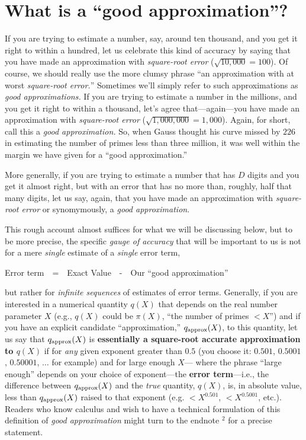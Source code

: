 \documentclass[11pt,draft]{article}
\theoremstyle{plain}
\theoremstyle{definition}
\numberwithin{equation}{section}
\numberwithin{figure}{section}
\numberwithin{table}{section}
\begin{document}
\section{What is a ``good approximation''?}\label{sec:sqrterror}

If you are trying to estimate a number, say, around ten thousand, and
you get it right to within a hundred, let us celebrate this kind of
accuracy by saying that you have made an approximation with {\em
  square-root error} (${\sqrt{10,\!000}}=100$). Of course, we should
really use the more clumsy phrase ``an approximation with at worst
{\em square-root error.}''  Sometimes we'll simply refer to such
approximations as {\em good approximations.} If you are trying to
estimate a number in the millions, and you get it right to within a
thousand, let's agree that---again---you have made an approximation
with {\em square-root error} (${\sqrt{1,\!000,\!000}}=1,\!000$).
Again, for short, call this a {\em good approximation.} So, when Gauss
thought his curve missed by $226$ in estimating the number of primes
less than three million, it was well within the margin we have given
for a ``good approximation.''

More generally, if you are trying to estimate a number that has $D$
digits and you get it almost right, but with an error that has no more
than, roughly, half that many digits, let us say, again, that you have
made an approximation with {\em square-root error} or synomymously, a
{\em good approximation}.


This rough account almost suffices for what we will be discussing
below, but to be more precise, the specific {\em gauge of accuracy}
that will be important to us is not for a mere {\em single} estimate
of a {\em single} error term, \bigskip
 
 \centerline{Error term\ \  =\ \    Exact Value\ \   -\ \   Our ``good  approximation''}
  
 \bigskip
 
 \noindent but rather for {\em infinite sequences} of estimates of
 error terms. Generally, if you are interested in a numerical quantity
 $q(X)$ that depends on the real number parameter $X$ (e.g., $q(X)$
 could be $\pi(X)$, ``the number of primes $< X$'') and if you have an
 explicit candidate ``approximation,'' $q_{\rm approx}(X)$, to this
 quantity, let us say that $q_{\rm approx}(X)$ is {\bf essentially a
   square-root accurate approximation to $q(X)$} if for {\em any}
 given exponent greater than $0.5$ (you choose it: $0.501$, $0.5001$,
 $0.50001$, $\dots$ for example) and for large enough $X$--- where the
 phrase ``large enough'' depends on your choice of exponent---the {\bf
   error term}---i.e., the difference between $q_{\rm approx}(X)$ and
 the {\em true} quantity, $q(X)$, is, in absolute value, less than
 $q_{\rm approx}(X)$ raised to that exponent (e.g. $< X^{0.501}$, $<
 X^{0.5001}$, etc.). Readers who know calculus and wish to have a
 technical formulation of this definition of {\em good approximation}
 might turn to the endnote $^2$ for a precise statement.
\end{document}
